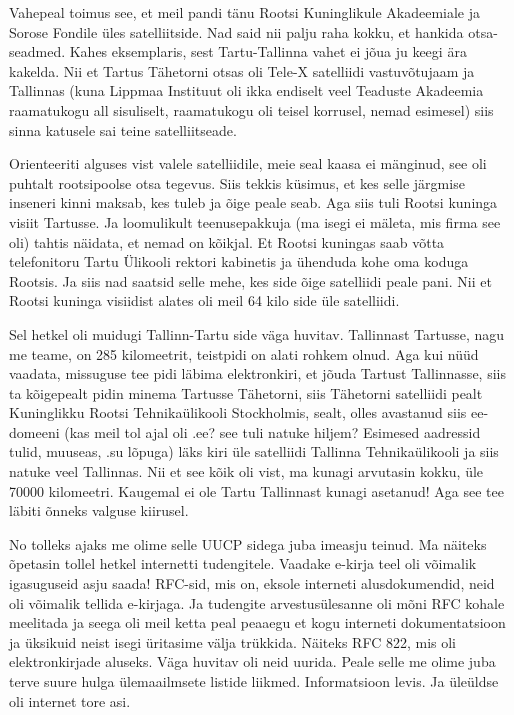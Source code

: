 
Vahepeal toimus see, et meil pandi tänu Rootsi Kuninglikule Akadeemiale ja 
Sorose Fondile üles satelliitside. Nad said nii palju raha 
kokku, et hankida otsa-seadmed. Kahes eksemplaris, sest Tartu-Tallinna vahet ei 
jõua ju keegi ära kakelda. Nii et Tartus Tähetorni otsas oli 
Tele-X satelliidi  vastuvõtujaam ja Tallinnas (kuna Lippmaa 
Instituut oli ikka endiselt veel Teaduste 
Akadeemia raamatukogu all sisuliselt, raamatukogu oli teisel korrusel, nemad 
esimesel) siis sinna katusele sai teine satelliitseade. 

Orienteeriti alguses vist valele satelliidile, meie seal kaasa ei mänginud, see 
oli puhtalt rootsipoolse otsa tegevus. Siis tekkis küsimus, et kes selle 
järgmise inseneri kinni maksab, kes tuleb ja õige peale seab. Aga siis tuli 
Rootsi kuninga visiit Tartusse. Ja loomulikult teenusepakkuja (ma isegi ei mäleta, mis firma 
see oli) tahtis näidata, et nemad on kõikjal. Et Rootsi kuningas saab võtta 
telefonitoru Tartu Ülikooli rektori kabinetis ja ühenduda kohe oma koduga 
Rootsis. Ja siis nad saatsid selle mehe, kes side õige satelliidi peale pani. 
Nii et Rootsi kuninga visiidist alates oli meil  64 kilo side üle satelliidi. 

Sel hetkel oli muidugi Tallinn-Tartu side väga huvitav. Tallinnast Tartusse, 
nagu me teame, on 285 kilomeetrit, teistpidi on alati rohkem olnud. Aga kui 
nüüd vaadata, missuguse tee pidi läbima elektronkiri, et jõuda Tartust 
Tallinnasse, siis ta kõigepealt pidin minema Tartusse Tähetorni, siis Tähetorni 
satelliidi pealt Kuninglikku Rootsi Tehnikaülikooli Stockholmis, sealt, olles 
avastanud siis ee-domeeni (kas meil tol ajal oli .ee? see tuli natuke hiljem? 
Esimesed aadressid tulid, muuseas, .su lõpuga) läks kiri üle satelliidi 
Tallinna Tehnikaülikooli ja siis natuke veel Tallinnas. Nii et see kõik oli 
vist, ma kunagi arvutasin kokku, üle 70000 kilomeetri. Kaugemal ei ole Tartu 
Tallinnast kunagi asetanud! Aga see tee läbiti õnneks valguse kiirusel. 


No tolleks ajaks me olime selle UUCP sidega juba  imeasju teinud. Ma näiteks 
õpetasin tollel hetkel internetti tudengitele. Vaadake e-kirja teel oli 
võimalik igasuguseid asju saada! RFC-sid, mis on, eksole interneti 
alusdokumendid, neid oli võimalik tellida e-kirjaga. Ja tudengite 
arvestusülesanne oli mõni RFC kohale meelitada ja seega oli meil ketta peal 
peaaegu et kogu interneti dokumentatsioon ja üksikuid neist isegi üritasime 
välja trükkida. Näiteks RFC 822, mis oli elektronkirjade aluseks. Väga huvitav 
oli neid uurida. Peale selle me olime juba terve suure hulga ülemaailmsete 
listide liikmed. Informatsioon levis. Ja üleüldse oli internet tore asi. 

